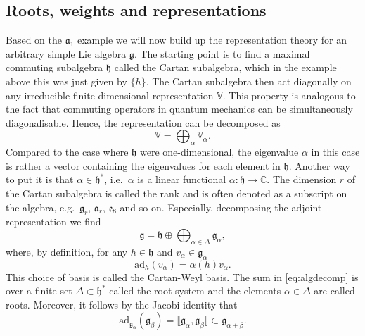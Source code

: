 \subsection{Roots, weights and representations}
Based on the $\mathfrak{a}_1$ example we will now build up the representation theory for an arbitrary simple Lie algebra $\mathfrak{g}$. The starting point is to find a maximal commuting subalgebra $\mathfrak{h}$ called the Cartan subalgebra, which in the example above this was just given by $\{h\}$. The Cartan subalgebra then act diagonally on any irreducible finite-dimensional representation $\mathbb{V}$. This property is analogous to the fact that commuting operators in quantum mechanics can be simultaneously diagonalisable. Hence, the representation can be decomposed as 
\begin{equation}
    \mathbb{V} = \bigoplus_\alpha \mathbb{V}_\alpha.
\end{equation}
Compared to the case where $\mathfrak{h}$ were one-dimensional, the eigenvalue $\alpha$ in this case is rather a vector containing the eigenvalues for each element in $\mathfrak{h}$. Another way to put it is that $\alpha\in \mathfrak{h}^*$, i.e.\ $\alpha$ is a linear functional $\alpha:\mathfrak{h}\to \mathbb{C}$. The dimension $r$ of the Cartan subalgebra is called the rank and is often denoted as a subscript on the algebra, e.g.\ $\mathfrak{g}_r$, $\mathfrak{a}_r$, $\mathfrak{e}_8$ and so on. Especially, decomposing the adjoint representation we find
\begin{equation}\label{eq:algdecomp}
    \mathfrak{g} = \mathfrak{h}\oplus\bigoplus_{\alpha\in\Delta} \mathfrak{g}_\alpha,
\end{equation}
where, by definition, for any $h\in\mathfrak{h}$ and $v_\alpha\in\mathfrak{g}_\alpha$ 
\begin{equation}
    \text{ad}_h(v_\alpha) = \alpha(h)v_\alpha.
\end{equation}
This choice of basis is called the Cartan-Weyl basis. The sum in \eqref{eq:algdecomp} is over a finite set $\Delta\subset\mathfrak{h}^*$ called the root system and the elements $\alpha\in\Delta$ are called roots. Moreover, it follows by the Jacobi identity that 
\begin{equation}
    \text{ad}_{\mathfrak{g}_\alpha}(\mathfrak{g}_\beta) = \llbracket\mathfrak{g}_\alpha,\mathfrak{g}_\beta\rrbracket \subset \mathfrak{g}_{\alpha+\beta}.
\end{equation}
